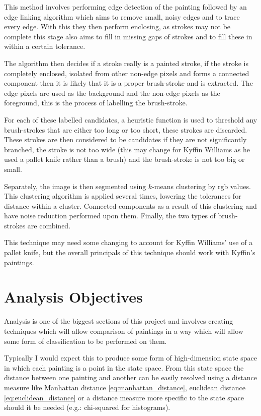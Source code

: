 This method involves performing edge detection of the painting followed by an edge linking 
algorithm which aims to remove small, noisy edges and to trace every edge. With this they then
perform enclosing, as strokes may not be complete this stage also aims to fill in missing gaps of
strokes and to fill these in within a certain tolerance.

The algorithm then decides if a stroke really is a painted stroke, if the stroke is completely 
enclosed, isolated from other non-edge pixels and forms a connected component then it is likely 
that it is a proper brush-stroke and is extracted. The edge pixels are used as the background and
the non-edge pixels as the foreground, this is the process of labelling the brush-stroke.

For each of these labelled candidates, a heuristic function is used to threshold any brush-strokes 
that are either too long or too short, these strokes are discarded. These strokes are then
considered to be candidates if they are not significantly branched, the stroke is not too wide 
(this may change for Kyffin Williams as he used a pallet knife rather than a brush) and the 
brush-stroke is not too big or small.

Separately, the image is then segmented using $k$-means clustering by \gls{rgb} values. This clustering 
algorithm is applied several times, lowering the tolerances for distance within a cluster. 
Connected components as a result of this clustering and have noise reduction performed upon them.
Finally, the two types of brush-strokes are combined.

This technique may need some changing to account for Kyffin Williams' use of a pallet knife, but
the overall principals of this technique should work with Kyffin's paintings.


\section{Analysis Objectives}
Analysis is one of the biggest sections of this project and involves creating techniques which 
will allow comparison of paintings in a way which will allow some form of classification to be
performed on them.

Typically I would expect this to produce some form of high-dimension state space in which each
painting is a point in the state space. From this state space the distance between one painting
and another can be easily resolved using a distance measure like Manhattan distance 
\eqref{eq:manhattan_distance}, euclidean distance \eqref{eq:euclidean_distance} or a distance 
measure more specific to the state space should it be needed (e.g.: chi-squared for histograms).

